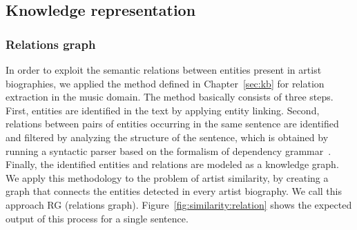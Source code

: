 
\subsection{Knowledge representation}\label{sec:similarity:knowledge_representations}

\subsubsection{Relations graph}\label{sec:similarity:rel_graph} %

In order to exploit the semantic relations between entities present in artist biographies, we applied the method defined in Chapter~\ref{sec:kb} for relation extraction in the music domain. The method basically consists of three steps. First, entities are identified in the text by applying entity linking. Second, relations between pairs of entities occurring in the same sentence are identified and filtered by analyzing the structure of the sentence, which is obtained by running a syntactic parser based on the formalism of dependency grammar~\citep{Bohnet2010}. Finally, the identified entities and relations are modeled as a knowledge graph.
We apply this methodology to the problem of artist similarity, by creating a graph that connects the entities detected in every artist biography. We call this approach RG (relations graph). Figure~\ref{fig:similarity:relation} shows the expected output of this process for a single sentence.

